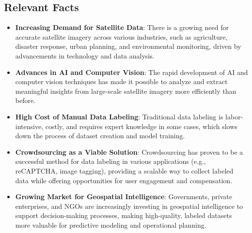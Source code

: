 \documentclass[12pt]{article}
\begin{document}
\subsection{Relevant Facts}
\begin{itemize}
    \item \textbf{Increasing Demand for Satellite Data}: There is a growing need for accurate satellite imagery across various industries, such as agriculture, disaster response, urban planning, and environmental monitoring, driven by advancements in technology and data analysis.
    \item \textbf{Advances in AI and Computer Vision}: The rapid development of AI and computer vision techniques has made it possible to analyze and extract meaningful insights from large-scale satellite imagery more efficiently than before.
    \item \textbf{High Cost of Manual Data Labeling}: Traditional data labeling is labor-intensive, costly, and requires expert knowledge in some cases, which slows down the process of dataset creation and model training.
    \item \textbf{Crowdsourcing as a Viable Solution}: Crowdsourcing has proven to be a successful method for data labeling in various applications (e.g., reCAPTCHA, image tagging), providing a scalable way to collect labeled data while offering opportunities for user engagement and compensation.
    \item \textbf{Growing Market for Geospatial Intelligence}: Governments, private enterprises, and NGOs are increasingly investing in geospatial intelligence to support decision-making processes, making high-quality, labeled datasets more valuable for predictive modeling and operational planning.
\end{itemize}
\end{document}
